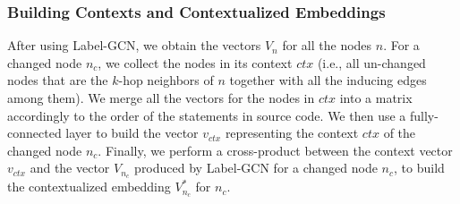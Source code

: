 

\subsubsection{{\bf Building Contexts and Contextualized Embeddings}}
After using Label-GCN, we obtain the vectors $V_n$ for all the nodes
$n$. For a changed node $n_c$, we collect the nodes in its context
$ctx$ (i.e., all un-changed nodes that are the $k$-hop neighbors of $n$
together with all the inducing edges among them). We merge all the
vectors for the nodes in $ctx$ into a matrix accordingly to the order
of the statements in source code. We then use a fully-connected layer
to build the vector $v_{ctx}$ representing the context $ctx$ of the
changed node $n_c$.
%
Finally, we perform a cross-product between the context vector $v_{ctx}$ and
the vector $V_{n_c}$ produced by Label-GCN for a changed node $n_c$, to
build the contextualized embedding $V^{*}_{n_c}$ for $n_c$.


